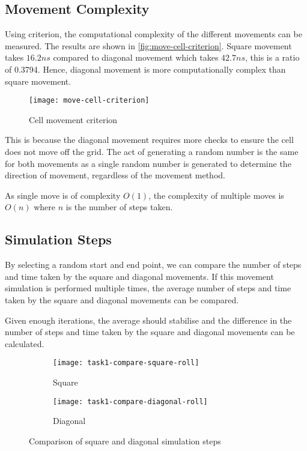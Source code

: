 \clearpage

\subsection{Movement Complexity}

Using criterion, the computational complexity of the different movements can be measured.
The results are shown in \autoref{fig:move-cell-criterion}.
Square movement takes $16.2ns$ compared to diagonal movement which takes $42.7ns$, 
this is a ratio of 0.3794.
Hence, diagonal movement is more computationally complex than square movement.

\begin{figure}[ht]
    \centering
    \texttt{[image: move-cell-criterion]}
    \caption[Cell movement criterion]{Cell movement criterion}
    \label{fig:move-cell-criterion}
\end{figure}



This is because the diagonal movement requires more checks to ensure the cell does not move off the grid.
The act of generating a random number is the same for both movements as a single random number is generated to determine the direction of movement, regardless of the movement method.

As single move is of complexity $O(1)$, the complexity of multiple moves is $O(n)$ where $n$ is the number of steps taken.

\clearpage

\subsection{Simulation Steps}

By selecting a random start and end point, we can compare the number of steps and time taken by the square and diagonal movements.
If this movement simulation is performed multiple times, the average number of steps and time taken by the square and diagonal movements can be compared.

Given enough iterations, the average should stabilise and the difference in the number of steps and time taken by the square and diagonal movements can be calculated.

\begin{figure}[ht]
    \centering
    \begin{subfigure}{\textwidth}
        \texttt{[image: task1-compare-square-roll]}
        \caption[Square]{Square}
        \label{fig:task1-compare-square-roll}
    \end{subfigure}

    \begin{subfigure}{\textwidth}
        \texttt{[image: task1-compare-diagonal-roll]}
        \caption[Diagonal]{Diagonal}
        \label{fig:task1-compare-diagonal-roll}
    \end{subfigure}

    \caption[Comparison of square and diagonal simulation steps]{Comparison of square and diagonal simulation steps}
    \label{fig:task1-compare-roll}
\end{figure}

